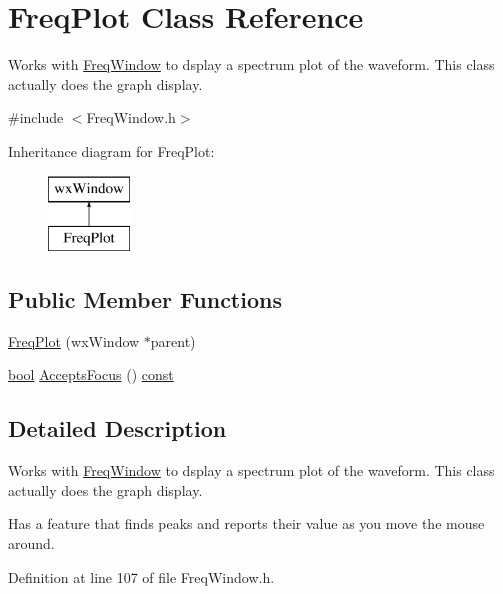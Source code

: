 \hypertarget{class_freq_plot}{}\section{Freq\+Plot Class Reference}
\label{class_freq_plot}


Works with \hyperlink{class_freq_window}{Freq\+Window} to dsplay a spectrum plot of the waveform. This class actually does the graph display.  




{\ttfamily \#include $<$Freq\+Window.\+h$>$}

Inheritance diagram for Freq\+Plot\+:\begin{figure}[H]
\begin{center}
\leavevmode
\includegraphics[height=2.000000cm]{class_freq_plot}
\end{center}
\end{figure}
\subsection*{Public Member Functions}
\begin{DoxyCompactItemize}
\item 
\hyperlink{class_freq_plot_ae47043b0edc3dbf2e425657eb327f4d9}{Freq\+Plot} (wx\+Window $\ast$parent)
\item 
\hyperlink{mac_2config_2i386_2lib-src_2libsoxr_2soxr-config_8h_abb452686968e48b67397da5f97445f5b}{bool} \hyperlink{class_freq_plot_a93adef613b21008d302f478bd0aa11bf}{Accepts\+Focus} () \hyperlink{getopt1_8c_a2c212835823e3c54a8ab6d95c652660e}{const} 
\end{DoxyCompactItemize}


\subsection{Detailed Description}
Works with \hyperlink{class_freq_window}{Freq\+Window} to dsplay a spectrum plot of the waveform. This class actually does the graph display. 

Has a feature that finds peaks and reports their value as you move the mouse around. 

Definition at line 107 of file Freq\+Window.\+h.



